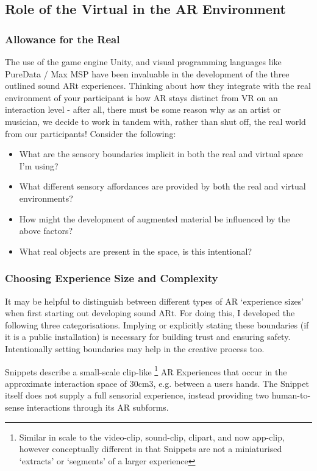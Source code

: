 \subsection{Role of the Virtual in the AR Environment} \label{sec: discussion-patterns-environment}
\subsubsection{Allowance for the Real}
The use of the game engine Unity, and visual programming languages like PureData / Max MSP have been invaluable in the development of the three outlined sound ARt experiences. Thinking about how they integrate with the real environment of your participant is how AR stays distinct from VR on an interaction level - after all, there must be some reason why as an artist or musician, we decide to work in tandem with, rather than shut off, the real world from our participants! Consider the following:
\begin{itemize}
    \item What are the sensory boundaries implicit in both the real and virtual space I'm using? 
    \item What different sensory affordances are provided by both the real and virtual environments? 
    \item How might the development of augmented material be influenced by the above factors?
    \item What real objects are present in the space, is this intentional?
\end{itemize}

\subsubsection{Choosing Experience Size and Complexity}
It may be helpful to distinguish between different types of AR `experience sizes' when first starting out developing sound ARt. For doing this, I developed the following three categorisations. Implying or explicitly stating these boundaries (if it is a public installation) is necessary for building trust and ensuring safety. Intentionally setting boundaries may help in the creative process too.

Snippets describe a small-scale clip-like \footnote{Similar in scale to the video-clip, sound-clip, clipart, and now app-clip, however conceptually different in that Snippets are not a miniaturised `extracts' or `segments' of a larger experience} AR Experiences that occur in the approximate interaction space of 30cm3, e.g. between a users hands. The Snippet itself does not supply a full sensorial experience, instead providing two human-to-sense interactions through its AR subforms.

